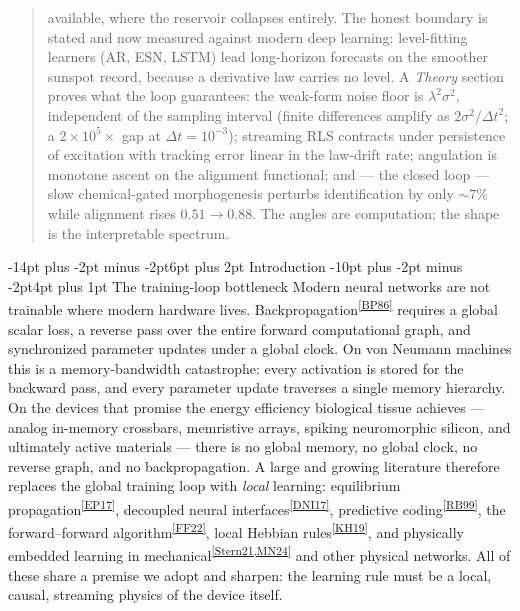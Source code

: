 \documentclass[10pt]{article}
\makeatletter
\newcommand{\natref}[1]{\textsuperscript{\ref{#1}}}
\renewcommand\section{\@startsection{section}{1}{\z@}%
  {-14pt plus -2pt minus -2pt}{6pt plus 2pt}%
  {\normalfont\bfseries\large}}
\renewcommand\subsection{\@startsection{subsection}{2}{\z@}%
  {-10pt plus -2pt minus -2pt}{4pt plus 1pt}%
  {\normalfont\bfseries\normalsize}}
\makeatother
\begin{document}
\begin{abstract}
available, where the reservoir collapses entirely. The honest boundary is stated and
now measured against modern deep learning: level-fitting learners (AR, ESN, LSTM)
lead long-horizon forecasts on the smoother sunspot record, because a derivative law
carries no level. A \emph{Theory} section proves what the loop guarantees: the
weak-form noise floor is $\lambda^2\sigma^2$, independent of the sampling interval
(finite differences amplify as $2\sigma^2/\Delta t^2$; a $2{\times}10^{5}\times$ gap
at $\Delta t = 10^{-3}$); streaming RLS contracts under persistence of excitation
with tracking error linear in the law-drift rate; angulation is monotone ascent on
the alignment functional; and --- the closed loop --- slow chemical-gated
morphogenesis perturbs identification by only ${\sim}7\%$ while alignment rises
$0.51 \to 0.88$. The angles are computation; the shape is the interpretable
spectrum.
\end{abstract}

\section{Introduction}
\subsection{The training-loop bottleneck}
Modern neural networks are not trainable where modern hardware lives.
Backpropagation\natref{BP86} requires a global scalar loss, a reverse pass over the
entire forward computational graph, and synchronized parameter updates under a global
clock. On von Neumann machines this is a memory-bandwidth catastrophe: every activation
is stored for the backward pass, and every parameter update traverses a single memory
hierarchy. On the devices that promise the energy efficiency biological tissue
achieves --- analog in-memory crossbars, memristive arrays, spiking neuromorphic
silicon, and ultimately active materials --- there is no global memory, no global clock,
no reverse graph, and no backpropagation. A large and growing literature therefore
replaces the global training loop with \emph{local} learning: equilibrium
propagation\natref{EP17}, decoupled neural interfaces\natref{DNI17}, predictive
coding\natref{RB99}, the forward--forward algorithm\natref{FF22}, local Hebbian
rules\natref{KH19}, and physically embedded learning in mechanical\natref{Stern21,MN24}
and other physical networks. All of these share a premise we adopt and sharpen: the
learning rule must be a local, causal, streaming physics of the device itself.
\end{document}
